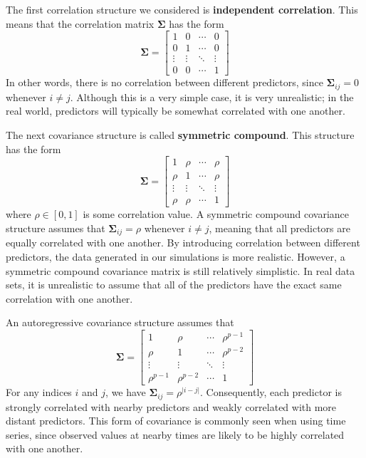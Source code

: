 \documentclass{article}
\begin{document}
The first correlation structure we considered is \textbf{independent correlation}. This means that the correlation matrix $\mathbf{\Sigma}$ has the form
\begin{equation}
	\mathbf{\Sigma} = \begin{bmatrix}
		1 & 0 & \cdots & 0 \\
		0 & 1 & \cdots & 0 \\
		\vdots & \vdots & \ddots & \vdots \\
		0 & 0 & \cdots & 1
	\end{bmatrix}
\end{equation}
In other words, there is no correlation between different predictors, since $\mathbf{\Sigma}_{ij} = 0$ whenever $i\neq j$. Although this is a very simple case, it is very unrealistic; in the real world, predictors will typically be somewhat correlated with one another.

The next covariance structure is called \textbf{symmetric compound}. This structure has the form
\begin{equation}\label{eqn:symmetric-compound-matrix}
	\mathbf{\Sigma} = \begin{bmatrix}
		1 & \rho & \cdots & \rho \\
		\rho & 1 & \cdots & \rho \\
		\vdots & \vdots & \ddots & \vdots \\
		\rho & \rho & \cdots & 1
	\end{bmatrix}
\end{equation}
where $\rho \in [0, 1]$ is some correlation value. A symmetric compound covariance structure assumes that $\mathbf{\Sigma}_{ij} = \rho$ whenever $i \neq j$, meaning that all predictors are equally correlated with one another. By introducing correlation between different predictors, the data generated in our simulations is more realistic. However, a symmetric compound covariance matrix is still relatively simplistic. In real data sets, it is unrealistic to assume that all of the predictors have the exact same correlation with one another.

An autoregressive covariance structure assumes that
\begin{equation}
	\mathbf{\Sigma} = \begin{bmatrix}
		1 & \rho & \cdots & \rho^{p - 1} \\
		\rho & 1 & \cdots & \rho^{p - 2} \\
		\vdots & \vdots & \ddots & \vdots \\
		\rho^{p - 1} & \rho^{p - 2} & \cdots & 1
	\end{bmatrix}
\end{equation}
For any indices $i$ and $j$, we have $\mathbf{\Sigma}_{ij} = \rho^{\vert i - j\vert}$. Consequently, each predictor is strongly correlated with nearby predictors and weakly correlated with more distant predictors. This form of covariance is commonly seen when using time series, since observed values at nearby times are likely to be highly correlated with one another. 
\end{document}
